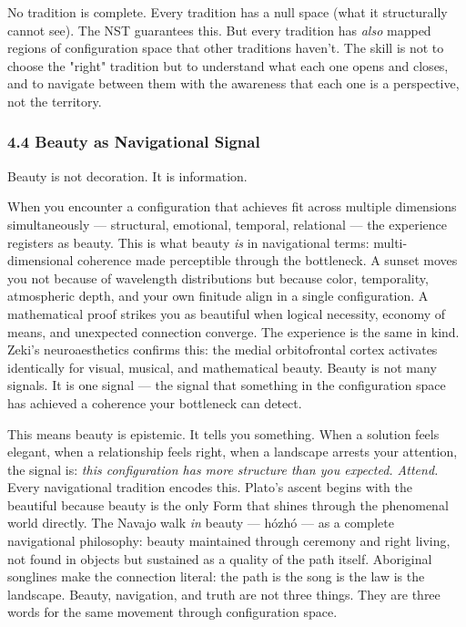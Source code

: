 No tradition is complete. Every tradition has a null space (what it structurally cannot see). The NST guarantees this. But every tradition has \textit{also} mapped regions of configuration space that other traditions haven't. The skill is not to choose the "right" tradition but to understand what each one opens and closes, and to navigate between them with the awareness that each one is a perspective, not the territory.


\subsubsection*{4.4 Beauty as Navigational Signal}


Beauty is not decoration. It is information.


When you encounter a configuration that achieves fit across multiple dimensions simultaneously — structural, emotional, temporal, relational — the experience registers as beauty. This is what beauty \textit{is} in navigational terms: multi-dimensional coherence made perceptible through the bottleneck. A sunset moves you not because of wavelength distributions but because color, temporality, atmospheric depth, and your own finitude align in a single configuration. A mathematical proof strikes you as beautiful when logical necessity, economy of means, and unexpected connection converge. The experience is the same in kind. Zeki's neuroaesthetics confirms this: the medial orbitofrontal cortex activates identically for visual, musical, and mathematical beauty. Beauty is not many signals. It is one signal — the signal that something in the configuration space has achieved a coherence your bottleneck can detect.


This means beauty is epistemic. It tells you something. When a solution feels elegant, when a relationship feels right, when a landscape arrests your attention, the signal is: \textit{this configuration has more structure than you expected. Attend.} Every navigational tradition encodes this. Plato's ascent begins with the beautiful because beauty is the only Form that shines through the phenomenal world directly. The Navajo walk \textit{in} beauty — hózhó — as a complete navigational philosophy: beauty maintained through ceremony and right living, not found in objects but sustained as a quality of the path itself. Aboriginal songlines make the connection literal: the path is the song is the law is the landscape. Beauty, navigation, and truth are not three things. They are three words for the same movement through configuration space.


